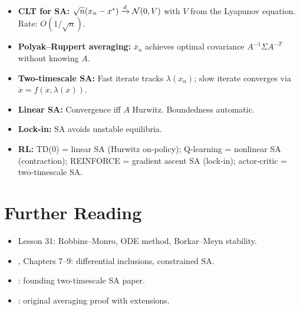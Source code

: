 \documentclass[11pt,a4paper]{article}
\begin{document}
\begin{itemize}[leftmargin=2em]
  \item \textbf{CLT for SA:} $\sqrt{n}(x_n - x^*) \xrightarrow{d}
    \mathcal{N}(0,V)$ with $V$ from the Lyapunov equation. Rate:
    $O(1/\sqrt{n})$.
  \item \textbf{Polyak--Ruppert averaging:} $\bar{x}_n$ achieves
    optimal covariance $A^{-1}\Sigma A^{-T}$ without knowing $A$.
  \item \textbf{Two-timescale SA:} Fast iterate tracks
    $\lambda(x_n)$; slow iterate converges via
    $\dot{x} = f(x,\lambda(x))$.
  \item \textbf{Linear SA:} Convergence iff $A$ Hurwitz. Boundedness
    automatic.
  \item \textbf{Lock-in:} SA avoids unstable equilibria.
  \item \textbf{RL:} TD(0) = linear SA (Hurwitz on-policy);
    Q-learning = nonlinear SA (contraction); REINFORCE = gradient
    ascent SA (lock-in); actor-critic = two-timescale SA.
\end{itemize}


\section{Further Reading}
\label{sec:further-reading}

\begin{itemize}[leftmargin=2em]
  \item Lesson 31: Robbins--Monro, ODE method, Borkar--Meyn stability.
  \item \citet{borkar2008}, Chapters 7--9: differential inclusions,
    constrained SA.
  \item \citet{borkar1997}: founding two-timescale SA paper.
  \item \citet{polyak1992}: original averaging proof with extensions.
\end{itemize}


\end{document}
